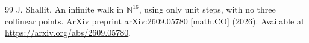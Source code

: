 \documentclass[12pt,reqno]{article}
\begin{document}
\begin{thebibliography}{99}
J. Shallit. An infinite walk in \(\mathbb N^{16}\), using only unit steps, with no three collinear points.
\newblock ArXiv preprint arXiv:2609.05780 [math.CO] (2026).  
\newblock Available at
\url{https://arxiv.org/abs/2609.05780}.






\end{thebibliography}
\end{document}
